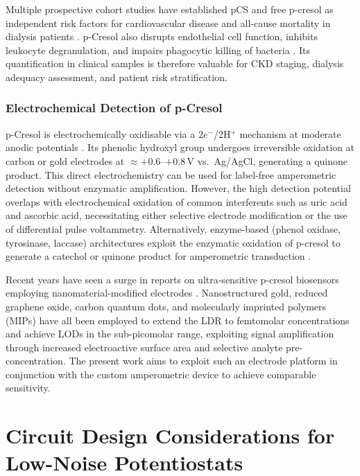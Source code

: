 Multiple prospective cohort studies have established pCS and free p-cresol as independent risk factors for cardiovascular disease and all-cause mortality in dialysis patients \cite{Meijers2010, Liabeuf2010}. p-Cresol also disrupts endothelial cell function, inhibits leukocyte degranulation, and impairs phagocytic killing of bacteria \cite{Vanholder2003}. Its quantification in clinical samples is therefore valuable for CKD staging, dialysis adequacy assessment, and patient risk stratification.

\subsubsection{Electrochemical Detection of p-Cresol}

p-Cresol is electrochemically oxidisable via a $2e^-$/2H$^+$ mechanism at moderate anodic potentials \cite{Wang2006}. Its phenolic hydroxyl group undergoes irreversible oxidation at carbon or gold electrodes at $\approx+0.6$--$+0.8$\,V vs.\ Ag/AgCl, generating a quinone product. This direct electrochemistry can be used for label-free amperometric detection without enzymatic amplification. However, the high detection potential overlaps with electrochemical oxidation of common interferents such as uric acid and ascorbic acid, necessitating either selective electrode modification or the use of differential pulse voltammetry. Alternatively, enzyme-based (phenol oxidase, tyrosinase, laccase) architectures exploit the enzymatic oxidation of p-cresol to generate a catechol or quinone product for amperometric transduction \cite{Fanjul-Bolado2008}.

Recent years have seen a surge in reports on ultra-sensitive p-cresol biosensors employing nanomaterial-modified electrodes \cite{Chandra2013}. Nanostructured gold, reduced graphene oxide, carbon quantum dots, and molecularly imprinted polymers (MIPs) have all been employed to extend the LDR to femtomolar concentrations and achieve LODs in the sub-picomolar range, exploiting signal amplification through increased electroactive surface area and selective analyte pre-concentration. The present work aims to exploit such an electrode platform in conjunction with the custom amperometric device to achieve comparable sensitivity.

\section{Circuit Design Considerations for Low-Noise Potentiostats}
\label{sec:circuit_design}

